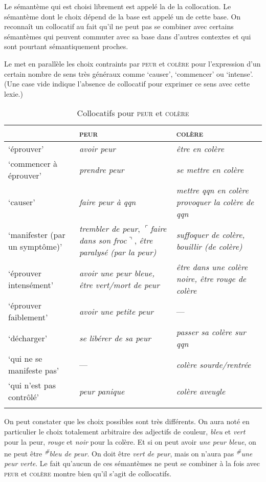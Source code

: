{Le sémantème qui est choisi librement est appelé la  de la collocation. Le sémantème dont le choix dépend de la base est appelé un  de cette base. On reconnaît un collocatif au fait qu’il ne peut pas se combiner avec certains sémantèmes qui peuvent commuter avec sa base dans d’autres contextes et qui sont pourtant sémantiquement proches.}%

Le  met en parallèle les choix contraints par \textsc{peur} et \textsc{colère} pour l’expression d’un certain nombre de sens très généraux comme ‘causer’, ‘commencer’ ou ‘intense’. (Une case vide indique l’absence de collocatif pour exprimer ce sens avec cette lexie.)

\begin{table}
\caption{Collocatifs pour \textsc{peur} et \textsc{colère}\label{tab:2-3:1}}
\begin{tabularx}{\textwidth}{QQQ}
\lsptoprule
 & {\scshape peur} & {\scshape colère}\\
 \midrule
‘éprouver’ & {\itshape avoir peur} & {\itshape être en colère}\\
‘commencer à éprouver’ & {\itshape prendre peur} & {\itshape se mettre en colère}\\
‘causer’ & {\itshape faire peur à qqn} & {\itshape mettre qqn en colère} {\itshape provoquer la colère de qqn}\\
‘manifester (par un symptôme)’ & \textit{trembler de peur}, $⌜$\textit{faire dans son froc}$⌝$, {\itshape être paralysé (par la peur)} & {\itshape suffoquer de colère, bouillir (de colère)}\\
‘éprouver intensément’ & {\itshape avoir une peur bleue, être vert/mort de peur} & {\itshape être dans une colère noire, être rouge de colère}\\
‘éprouver faiblement’ & {\itshape avoir une petite peur} & --- \\
‘décharger’ & {\itshape se libérer de sa peur} & {\itshape passer sa colère sur qqn}\\
‘qui ne se manifeste pas’ & --- & {\itshape colère sourde/rentrée}\\
‘qui n’est pas contrôlé’ & {\itshape peur panique} & {\itshape colère aveugle}\\
\lspbottomrule
\end{tabularx}
\end{table}

On peut constater que les choix possibles sont très différents. On aura noté en particulier le choix totalement arbitraire des adjectifs de couleur, \textit{bleu} et \textit{vert} pour la peur, \textit{rouge} et \textit{noir} pour la colère. Et si on peut avoir \textit{une peur bleue}, on ne peut être \textit{\textsuperscript{\#}}\textit{bleu de peur}. On doit être \textit{vert de peur}, mais on n’aura pas \textit{\textsuperscript{\#}}\textit{une peur verte}. Le fait qu’aucun de ces sémantèmes ne peut se combiner à la fois avec \textsc{peur} et \textsc{colère} montre bien qu’il s’agit de collocatifs.

